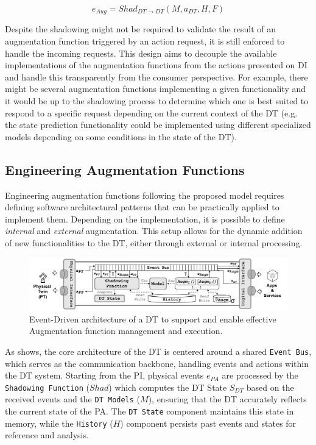 \begin{equation}
    e_{Aug} = Shad_{DT \rightarrow DT}(M, a_{DT}, H, F)
\end{equation}


Despite the shadowing might not be required to validate the result of an augmentation function triggered by an action request, it is still enforced to handle the incoming requests. 
This design aims to decouple the available implementations of the augmentation functions from the actions presented on \ac{DI} and handle this transparently from the consumer perspective.
For example, there might be several augmentation functions implementing a given functionality and it would be up to the shadowing process to determine which one is best suited to respond to a specific request depending on the current context of the \ac{DT} (e.g. the state prediction functionality could be implemented using different specialized models depending on some conditions in the state of the \ac{DT}).

\subsection{Engineering Augmentation Functions}

Engineering augmentation functions following the proposed model requires defining
software architectural patterns that can be practically applied to implement them.
Depending on the implementation, it is possible to define \emph{internal} and \emph{external} augmentation.  
This setup allows for the dynamic addition of new functionalities to the \ac{DT}, either through external or internal processing.

\begin{figure}
    \centering
    \includegraphics[width=\textwidth]{figures/event_driven_augmentation.pdf}
    \caption{Event-Driven architecture of a DT to support and enable effective Augmentation function management and execution.}
    \label{fig:event_driven_augmentation}
\end{figure}

As  shows, the core architecture of the \ac{DT} is centered around a shared \texttt{Event Bus}, which serves as the communication backbone, handling events and actions within the \ac{DT} system.
Starting from the \ac{PI}, physical events \( e_{PA} \) are processed by the \texttt{Shadowing Function} ($Shad$) which computes the \ac{DT} State $S_{DT}$ based on the received events and the \texttt{\ac{DT} Models} ($M$), ensuring that the \ac{DT} accurately reflects the current state of the \ac{PA}.
The \texttt{\ac{DT} State} component maintains this state in memory, while the \texttt{History} ($H$) component persists past events and states for reference and analysis.

